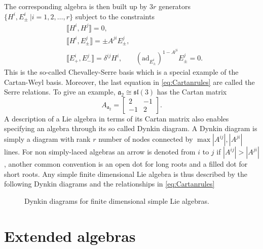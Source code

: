 The corresponding algebra is then built up by $3r$ generators $\{H^i,E_{\pm}^i\ |i=1,2,\ldots,r\}$ subject to the constraints
\begin{align*}\label{eq:Cartanrules}
    &\llbracket H^i,H^j\rrbracket = 0,\\
    &\llbracket H^i,E_{\pm}^j\rrbracket = \pm A^{ji}E_{\pm}^{j},\\
    &\llbracket E_+^i,E_-^j\rrbracket = \delta^{ij}H^i,
    &(\text{ad}_{E_{\pm}^i})^{1-A^{ji}}E^j_\pm = 0.
\end{align*}
This is the so-called Chevalley-Serre basis which is a special example of the Cartan-Weyl basis. Moreover, the last equation in \eqref{eq:Cartanrules} are called the Serre relations. To give an example, $\mathfrak{a}_2\cong \mathfrak{sl}(3)$ has the Cartan matrix
\begin{equation}
    A_\mathfrak{a_2}=\begin{bmatrix}2&-1\\-1&2\end{bmatrix}.
\end{equation}
A description of a Lie algebra in terms of its Cartan matrix also enables specifying an algebra through its so called Dynkin diagram. A Dynkin diagram is simply a diagram with rank $r$ number of nodes connected by $\max{|A^{ij}|,|A^{ji}|}$ lines. For non simply-laced algebras an arrow is denoted from $i$ to $j$ if $|A^{ij}|>|A^{ji}|$, another common convention is an open dot for long roots and a filled dot for short roots. Any simple finite dimensional Lie algebra is thus described by the following Dynkin diagrams and the relationships in \eqref{eq:Cartanrules}
\begin{figure}
    \centering
    \AllDynkin
    \caption{Dynkin diagrams for finite dimensional simple Lie algebras.}
    \label{fig:AllDynkin}
\end{figure}



\section{Extended algebras}\label{sec:KacMoody}